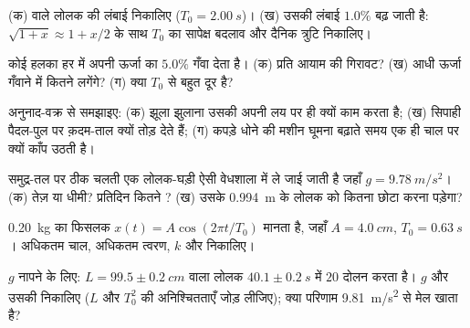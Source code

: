 \begin{exercise}[$\star\star$]\label{exo:g12:oscillators-and-time:9}
(क)  वाले लोलक की लंबाई निकालिए ($T_0 =
\qty{2.00}{s}$)। (ख) उसकी लंबाई $1.0\%$ बढ़
जाती है: $\sqrt{1+x}
\approx 1 + x/2$ के साथ $T_0$ का सापेक्ष बदलाव और दैनिक त्रुटि निकालिए।
\end{exercise}

\begin{exercise}[$\star\star$]\label{exo:g12:oscillators-and-time:10}
कोई हलका   हर  में अपनी
ऊर्जा का $5.0\%$ गँवा देता है। (क) प्रति 
आयाम की गिरावट? (ख) आधी ऊर्जा गँवाने में कितने
 लगेंगे? (ग) क्या  $T_0$ से बहुत दूर
है?
\end{exercise}

\begin{exercise}[$\star\star$]\label{exo:g12:oscillators-and-time:11}
अनुनाद-वक्र से समझाइए: (क) झूला झुलाना उसकी अपनी लय पर ही क्यों
काम करता है; (ख) सिपाही पैदल-पुल पर क़दम-ताल क्यों तोड़ देते हैं;
(ग) कपड़े धोने की मशीन घूमना बढ़ाते समय एक ही चाल पर क्यों काँप उठती है।
\end{exercise}

\begin{exercise}[$\star\star\star$]\label{exo:g12:oscillators-and-time:12}
समुद्र-तल पर ठीक चलती एक लोलक-घड़ी ऐसी वेधशाला में ले जाई जाती है जहाँ $g = \qty{9.78}{m/s^2}$।
(क) तेज़ या धीमी? प्रतिदिन कितने ? (ख) उसके \qty{0.994}{m} के लोलक को कितना छोटा
करना पड़ेगा?
\end{exercise}

\begin{exercise}[$\star\star\star$]\label{exo:g12:oscillators-and-time:13}
\qty{0.20}{kg} का फिसलक $x(t) = A\cos(2\pi t/T_0)$ मानता है, जहाँ $A =
\qty{4.0}{cm}$, $T_0 = \qty{0.63}{s}$। अधिकतम चाल, अधिकतम
त्वरण,  $k$ और  निकालिए।
\end{exercise}

\begin{exercise}[$\star\star\star$]\label{exo:g12:oscillators-and-time:14}
$g$ नापने के लिए: $L = 99.5 \pm \qty{0.2}{cm}$ वाला लोलक $40.1 \pm \qty{0.2}{s}$ में $20$ दोलन करता है।
$g$ और उसकी  निकालिए ($L$ और $T_0^2$ की
अनिश्चितताएँ जोड़ लीजिए); क्या परिणाम \qty{9.81}{m/s^2} से मेल खाता है?
\end{exercise}

